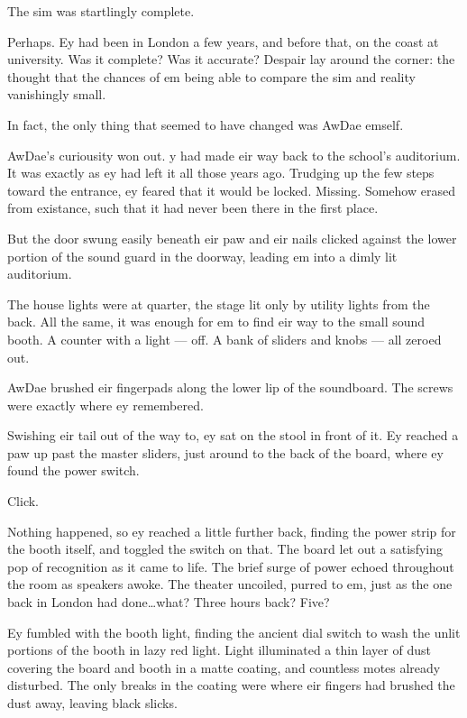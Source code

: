 
The sim was startlingly complete.

Perhaps. Ey had been in London a few years, and before that, on the coast at university. Was it complete? Was it accurate? Despair lay around the corner: the thought that the chances of em being able to compare the sim and reality vanishingly small.

In fact, the only thing that seemed to have changed was AwDae emself.

AwDae's curiousity won out. y had made eir way back to the school's auditorium. It was exactly as ey had left it all those years ago. Trudging up the few steps toward the entrance, ey feared that it would be locked. Missing. Somehow erased from existance, such that it had never been there in the first place.

But the door swung easily beneath eir paw and eir nails clicked against the lower portion of the sound guard in the doorway, leading em into a dimly lit auditorium.

The house lights were at quarter, the stage lit only by utility lights from the back. All the same, it was enough for em to find eir way to the small sound booth. A counter with a light --- off. A bank of sliders and knobs --- all zeroed out.

AwDae brushed eir fingerpads along the lower lip of the soundboard. The screws were exactly where ey remembered.

Swishing eir tail out of the way to, ey sat on the stool in front of it. Ey reached a paw up past the master sliders, just around to the back of the board, where ey found the power switch.

Click.

Nothing happened, so ey reached a little further back, finding the power strip for the booth itself, and toggled the switch on that. The board let out a satisfying pop of recognition as it came to life. The brief surge of power echoed throughout the room as speakers awoke. The theater uncoiled, purred to em, just as the one back in London had done\ldots{}what? Three hours back? Five?

Ey fumbled with the booth light, finding the ancient dial switch to wash the unlit portions of the booth in lazy red light. Light illuminated a thin layer of dust covering the board and booth in a matte coating, and countless motes already disturbed. The only breaks in the coating were where eir fingers had brushed the dust away, leaving black slicks.


